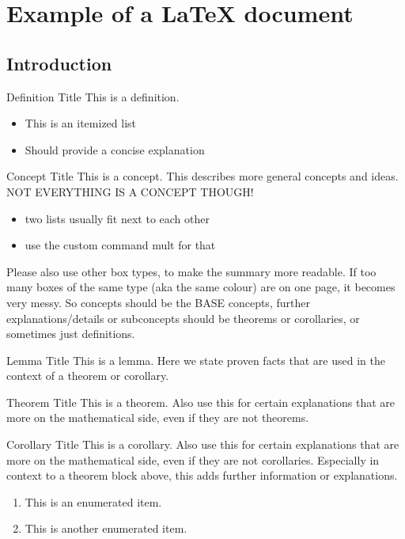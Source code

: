 \section{Example of a LaTeX document}

\subsection{Introduction}


\begin{definition}{Definition Title}
    This is a definition.
    \begin{itemize}
        \item This is an itemized list
        \item Should provide a concise explanation
    \end{itemize}
\end{definition}

\begin{concept}{Concept Title}
    This is a concept. This describes more general concepts and ideas. NOT EVERYTHING IS A CONCEPT THOUGH!
    \begin{itemize}
        \item two lists usually fit next to each other
        \item use the custom command mult for that 
    \end{itemize}
    Please also use other box types, to make the summary more readable. If too many boxes of the same type (aka the same colour) are on one page, it becomes very messy.
    So concepts should be the BASE concepts, further explanations/details or subconcepts should be theorems or corollaries, or sometimes just definitions.
\end{concept}

\multend 

\begin{lemma}{Lemma Title}
    This is a lemma. Here we state proven facts that are used in the context of a theorem or corollary.
\end{lemma}

\begin{theorem}{Theorem Title}
    This is a theorem. Also use this for certain explanations that are more on the mathematical side, even if they are not theorems.
\end{theorem}

\begin{corollary}{Corollary Title}
    This is a corollary. Also use this for certain explanations that are more on the mathematical side, even if they are not corollaries. 
    Especially in context to a theorem block above, this adds further information or explanations.
    \begin{enumerate}
        \item This is an enumerated item.
        \item This is another enumerated item.
    \end{enumerate}
\end{corollary}


